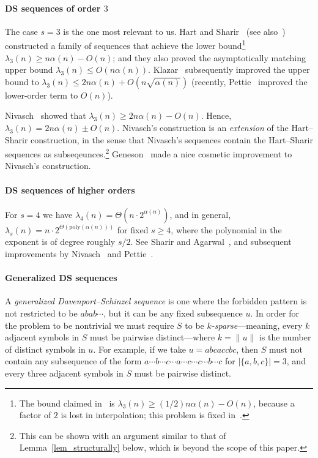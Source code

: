 \documentclass[11pt]{article}
\theoremstyle{definition}
\theoremstyle{remark}
\begin{document}
\paragraph{DS sequences of order $3$}
The case $s=3$ is the one most relevant to us. Hart and Sharir~\cite{HS} (see also~\cite{yo_DS,DS_book}) constructed a family of sequences that achieve the lower bound\footnote{The bound claimed in~\cite{DS_book} is $\lambda_3(n) \ge (1/2) n\alpha(n)-O(n)$, because a factor of $2$ is lost in interpolation; this problem is fixed in~\cite{yo_DS}.} $\lambda_3(n) \ge n\alpha(n) - O(n)$; and they also proved the asymptotically matching upper bound $\lambda_3(n) \le O(n\alpha(n))$. Klazar~\cite{klazar} subsequently improved the upper bound to $\lambda_3(n) \le 2n\alpha(n) + O(n\sqrt{\alpha(n)})$ (recently, Pettie~\cite{pettie_sharp} improved the lower-order term to $O(n)$).

Nivasch~\cite{yo_DS} showed that $\lambda_3(n) \ge 2n\alpha(n) - O(n)$. Hence, $\lambda_3(n) = 2n\alpha(n) \pm O(n)$.  Nivasch's construction is an \emph{extension} of the Hart--Sharir construction, in the sense that Nivasch's sequences contain the Hart--Sharir sequences as subseqeunces.\footnote{This can be shown with an argument similar to that of Lemma~\ref{lem_structurally} below, which is beyond the scope of this paper.} Geneson~\cite{geneson} made a nice cosmetic improvement to Nivasch's construction.

\paragraph{DS sequences of higher orders}
For $s=4$ we have $\lambda_4(n) = \Theta(n\cdot 2^{\alpha(n)})$, and in general, $\lambda_s(n) = n\cdot 2^{\Theta(\mathrm{poly}(\alpha(n)))}$ for fixed $s\ge 4$, where the polynomial in the exponent is of degree roughly $s/2$. See Sharir and Agarwal~\cite{DS_book}, and subsequent improvements by Nivasch~\cite{yo_DS} and Pettie~\cite{pettie_sharp}.

\paragraph{Generalized DS sequences}
A \emph{generalized Davenport--Schinzel sequence} is one where the forbidden pattern is not restricted to be $abab\cdots$, but it can be any fixed subsequence $u$. In order for the problem to be nontrivial we must require $S$ to be \emph{$k$-sparse}---meaning, every $k$ adjacent symbols in $S$ must be pairwise distinct---where $k = \|u\|$ is the number of distinct symbols in $u$. For example, if we take $u=abcaccbc$, then $S$ must not contain any subsequence of the form $a\cdots b\cdots c\cdots a\cdots c\cdots c\cdots b\cdots c$ for $|\{a,b,c\}|=3$, and every three adjacent symbols in $S$ must be pairwise distinct.
\end{document}
